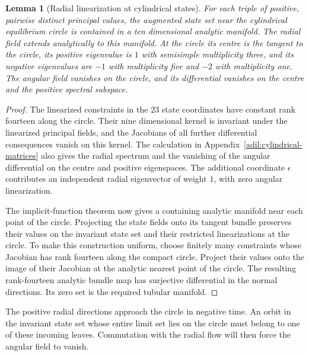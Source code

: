 \documentclass[11pt,a4paper]{article}
\numberwithin{equation}{section}
\theoremstyle{plain}
\newtheorem{lemma}[theorem]{Lemma}
\theoremstyle{definition}
\theoremstyle{remark}
\begin{document}
\begin{lemma}[Radial linearization at cylindrical states]\label{dil:carrier}
For each triple of positive, pairwise distinct principal values,
the augmented state set near the cylindrical equilibrium circle is
contained in a ten dimensional analytic manifold. The radial field
extends analytically to this manifold. At the circle its centre is
the tangent to the circle, its positive eigenvalue is $1$ with
semisimple multiplicity three, and its negative eigenvalues are
$-1$ with multiplicity five and $-2$ with multiplicity one.
The angular field vanishes on the circle, and its differential
vanishes on the centre and the positive spectral subspace.
\end{lemma}
\begin{proof}
The linearized constraints in the $23$ state coordinates have
constant rank fourteen along the circle. Their nine dimensional
kernel is invariant under the linearized principal fields, and
the Jacobians of all further differential consequences vanish on
this kernel. The calculation in
Appendix~\ref{adil:cylindrical-matrices} also gives the radial
spectrum and the vanishing of the angular differential on the
centre and positive eigenspaces. The additional coordinate
$\epsilon$ contributes an independent radial eigenvector of weight
$1$, with zero angular linearization.

The implicit-function theorem now gives a containing analytic
manifold near each point of the circle. Projecting the state fields
onto its tangent bundle preserves their values on the invariant state
set and their restricted linearizations at the circle. To make this
construction uniform, choose finitely many constraints whose
Jacobian has rank fourteen along the compact circle. Project their
values onto the image of their Jacobian at the analytic nearest
point of the circle. The resulting rank-fourteen analytic bundle
map has surjective differential in the normal directions. Its zero
set is the required tubular manifold.
\end{proof}

The positive radial directions approach the circle in negative
time. An orbit in the invariant state set whose entire limit set lies on the circle
must belong to one of these incoming leaves. Commutation with the
radial flow will then force the angular field to vanish.
\end{document}
